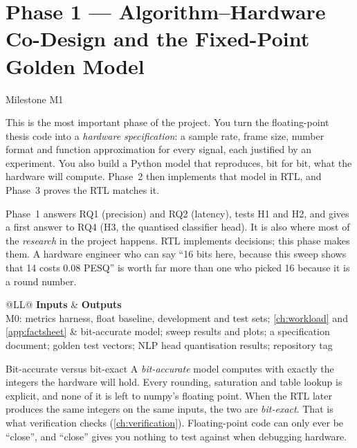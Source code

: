 \chapter{Phase 1 --- Algorithm--Hardware Co-Design and the Fixed-Point Golden Model}\label{ch:codesign}

 \quad Milestone M1

This is the most important phase of the project. You turn the floating-point
thesis code into a \emph{hardware specification}: a sample rate, frame size,
number format and function approximation for every signal, each justified by an
experiment. You also build a Python model that reproduces, bit for bit, what the
hardware will compute. Phase~2 then implements that model in RTL, and Phase~3
proves the RTL matches it.

\begin{whybox}
Phase~1 answers RQ1 (precision) and RQ2 (latency), tests H1 and H2, and gives a
first answer to RQ4 (H3, the quantised classifier head). It is also where most
of the \emph{research} in the project happens. RTL implements decisions; this
phase makes them. A hardware engineer who can say \enquote{16 bits here, because
this sweep shows that 14 costs 0.08 PESQ} is worth far more than one who picked
16 because it is a round number.
\end{whybox}

\begin{center}\small
\begin{tabularx}{\textwidth}{@{}LL@{}}
\toprule
\textbf{Inputs} & \textbf{Outputs} \\
\midrule
M0: metrics harness, float baseline, development and test sets; \cref{ch:workload}
and \cref{app:factsheet}
&  bit-accurate model; sweep results and plots; a specification
document; golden test vectors; NLP head quantisation results; repository tag
 \\
\bottomrule
\end{tabularx}
\end{center}

\begin{conceptbox}{Bit-accurate versus bit-exact}
A \emph{bit-accurate} model computes with exactly the integers the hardware
will hold. Every rounding, saturation and table lookup is explicit, and none of
it is left to numpy's floating point. When the RTL later produces the same
integers on the same inputs, the two are \emph{bit-exact}. That is what
verification checks (\cref{ch:verification}). Floating-point code can only ever
be \enquote{close}, and \enquote{close} gives you nothing to test against when
debugging hardware.
\end{conceptbox}

